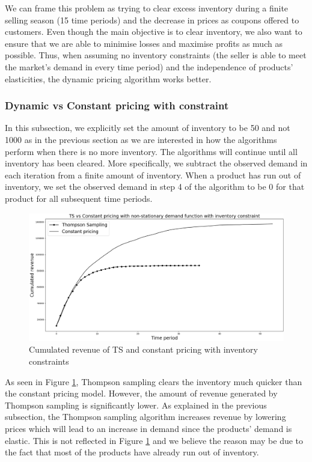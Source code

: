 \documentclass[a4paper]{article}
\begin{document}
\newline
\newline
We can frame this problem as trying to clear excess inventory during a finite selling season (15 time periods) and the decrease in prices as coupons offered to customers. Even though the main objective is to clear inventory, we also want to ensure that we are able to minimise losses and maximise profits as much as possible. Thus, when assuming no inventory constraints (the seller is able to meet the market's demand in every time period) and the independence of products' elasticities, the dynamic pricing algorithm works better.

\subsubsection{Dynamic vs Constant pricing with constraint}
In this subsection, we explicitly set the amount of inventory to be 50 and not 1000 as in the previous section as we are interested in how the algorithms perform when there is no more inventory. The algorithms will continue until all inventory has been cleared. More specifically, we subtract the observed demand in each iteration from a finite amount of inventory. When a product has run out of inventory, we set the observed demand in step 4 of the algorithm to be 0 for that product for all subsequent time periods.
\begin{figure}[h]
	\centering
	\includegraphics[width=1.03\textwidth]{4.png}
	\caption{\label{fig:five}Cumulated revenue of TS and constant pricing with inventory constraints}
\end{figure}
\newline
\newline
As seen in Figure \ref{fig:five}, Thompson sampling clears the inventory much quicker than the constant pricing model. However, the amount of revenue generated by Thompson sampling is significantly lower. As explained in the previous subsection, the Thompson sampling algorithm increases revenue by lowering prices which will lead to an increase in demand since the products' demand is elastic. This is not reflected in Figure \ref{fig:five} and we believe the reason may be due to the fact that most of the products have already run out of inventory. 
\end{document}
